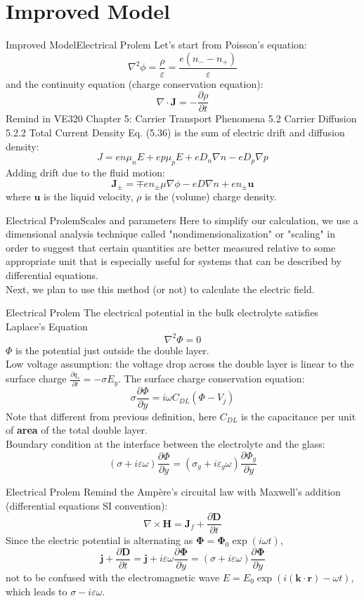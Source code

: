 \documentclass[11pt]{beamer}
\begin{document}
\section{Improved Model}
\begin{frame}{Improved Model}{Electrical Prolem}
    Let's start from Poisson's equation:
    \[\nabla^2\phi=\frac{\rho}{\varepsilon}=\frac{e(n_--n_+)}{\varepsilon}\]
    and the continuity equation (charge conservation equation):
    \[\nabla\cdot\bm{J}=-\frac{\partial\rho}{\partial t}\]
    Remind in VE320 Chapter 5: Carrier Transport Phenomena 5.2 Carrier Diffusion 5.2.2 Total Current Density Eq. (5.36) is the sum of electric drift and diffusion density:
    \[J=en\mu_nE+ep\mu_pE+eD_n\nabla n-eD_p\nabla p\]
    Adding drift due to the fluid motion:
    \[\bm{J}_\pm=\mp en_\pm\mu\nabla\phi-eD\nabla n+en_\pm\bm{u}\]
    where $\bm{u}$ is the liquid velocity, $\rho$ is the (volume) charge density.
\end{frame}
\begin{frame}{Electrical Prolem}{Scales and parameters}
    Here to simplify our calculation, we use a dimensional analysis technique called "nondimensionalization" or "scaling" in order to suggest that certain quantities are better measured relative to some appropriate unit that is especially useful for systems that can be described by differential equations.\\
    Next, we plan to use this method (or not) to calculate the electric field.
\end{frame}
\begin{frame}{Electrical Prolem}
    The electrical potential in the bulk electrolyte satisfies Laplace's Equation
    \[\nabla^2\Phi=0\]
    $\Phi$ is the potential just outside the double layer.\\
    Low voltage assumption: the voltage drop across the double layer is linear to the surface charge $\frac{\partial q_s}{\partial t}=-\sigma E_y$. The surface charge conservation equation:
    \[\sigma\frac{\partial\Phi}{\partial y}=i\omega C_{DL}(\Phi-V_j)\]
    Note that different from previous definition, here $C_{DL}$ is the capacitance per unit of \textbf{area} of the total double layer.\\
    Boundary condition at the interface between the electrolyte and the glass:
    \[(\sigma+i\varepsilon\omega)\frac{\partial\Phi}{\partial y}=(\sigma_g+i\varepsilon_g\omega)\frac{\partial\Phi_g}{\partial y}\]
\end{frame}
\begin{frame}{Electrical Prolem}
    Remind the Ampère's circuital law with Maxwell's addition (differential equations SI convention):
    \[\nabla\times\bm{H}=\bm{J}_f+\frac{\partial\bm{D}}{\partial t}\]
    Since the electric potential is alternating as $\bm{\Phi}=\bm{\Phi}_0\exp{\left(i\omega t\right)}$,
    \[\bm{j}+\frac{\partial\bm{D}}{\partial t}=\bm{j}+i\varepsilon\omega\frac{\partial\bm{\Phi}}{\partial y}=(\sigma+i\varepsilon\omega)\frac{\partial\bm{\Phi}}{\partial y}\]
    not to be confused with the electromagnetic wave $E=E_0\exp{(i(\bm{k}\cdot\bm{r})-\omega t)}$, which leads to $\sigma-i\varepsilon\omega$.
\end{frame}
\end{document}
